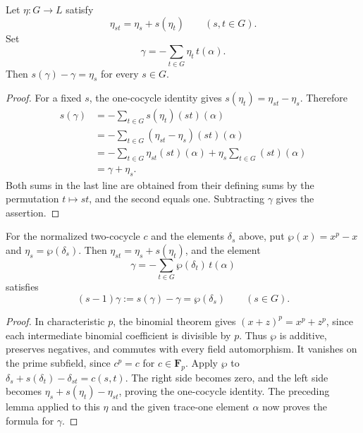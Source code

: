 \begin{lemma}
\label{lem:witt-one-cocycle-solution}
\leanok
Let $\eta:G\to L$ satisfy
\[
 \eta_{st}=\eta_s+s(\eta_t)\qquad(s,t\in G).
\]
Set
\[
 \gamma=-\sum_{t\in G}\eta_t\,t(\alpha).
\]
Then $s(\gamma)-\gamma=\eta_s$ for every $s\in G$.
\end{lemma}

\begin{proof}
For a fixed $s$, the one-cocycle identity gives
$s(\eta_t)=\eta_{st}-\eta_s$. Therefore
\[
\begin{aligned}
 s(\gamma)
 &=-\sum_{t\in G}s(\eta_t)(st)(\alpha)\\
 &=-\sum_{t\in G}(\eta_{st}-\eta_s)(st)(\alpha)\\
 &=-\sum_{t\in G}\eta_{st}(st)(\alpha)
      +\eta_s\sum_{t\in G}(st)(\alpha)\\
 &=\gamma+\eta_s.
\end{aligned}
\]
Both sums in the last line are obtained from their defining sums
by the permutation $t\mapsto st$, and the second equals one.
Subtracting $\gamma$ gives the assertion.
\end{proof}

\begin{lemma}
\label{lem:witt-artin-schreier-cocycle}
\leanok
For the normalized two-cocycle $c$ and the elements $\delta_s$
above, put $\wp(x)=x^p-x$ and $\eta_s=\wp(\delta_s)$.
Then $\eta_{st}=\eta_s+s(\eta_t)$, and the element
\[
 \gamma=-\sum_{t\in G}\wp(\delta_t)\,t(\alpha)
\]
satisfies
\[
 (s-1)\gamma:=s(\gamma)-\gamma=\wp(\delta_s)
 \qquad(s\in G).
\]
\end{lemma}

\begin{proof}
In characteristic $p$, the binomial theorem gives
$(x+z)^p=x^p+z^p$, since each intermediate binomial coefficient
is divisible by $p$. Thus $\wp$ is additive, preserves negatives,
and commutes with every field automorphism. It vanishes on the
prime subfield, since $c^p=c$ for $c\in\mathbf F_p$.
Apply $\wp$ to
$\delta_s+s(\delta_t)-\delta_{st}=c(s,t)$.
The right side becomes zero, and the left side becomes
$\eta_s+s(\eta_t)-\eta_{st}$, proving the one-cocycle identity.
The preceding lemma applied to this $\eta$ and the given
trace-one element $\alpha$ now proves the formula for $\gamma$.
\end{proof}

